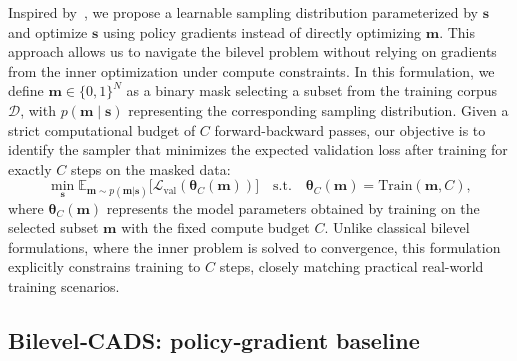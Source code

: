 Inspired by~\cite{ds_bi_zhou2022probabilistic}, we propose a learnable sampling distribution parameterized by \(\bm{s}\) and optimize \(\bm{s}\) using policy gradients instead of directly optimizing \(\bm{m}\). This approach allows us to navigate the bilevel problem without relying on gradients from the inner optimization under compute constraints.
In this formulation, we define \(\bm{m} \in \{0,1\}^N\) as a binary mask selecting a subset from the training corpus \(\mathcal{D}\), with \(p(\bm{m} \mid \bm{s})\) representing the corresponding sampling distribution. Given a strict computational budget of \(C\) forward-backward passes, our objective is to identify the sampler that minimizes the expected validation loss after training for exactly \(C\) steps on the masked data:
\begin{equation}  
\label{eq:bilevel}
\min_{\bm{s}} \mathbb{E}_{\bm{m} \sim p(\bm{m}|\bm{s})} \big[\mathcal{L}_{\mathrm{val}}(\bm{\theta}_C(\bm{m}))\big] \quad \text{s.t.} \quad \bm{\theta}_C(\bm{m}) = \mathrm{Train}(\bm{m}, C),
\end{equation}
where $\bm{\theta}_C(\bm{m})$ represents the model parameters obtained by training on the selected subset $\bm{m}$ with the fixed compute budget $C$. Unlike classical bilevel formulations, where the inner problem is solved to convergence, this formulation explicitly constrains training to $C$ steps, closely matching practical real-world training scenarios.  

\subsection{Bilevel‑CADS: policy‑gradient baseline}  
\label{sec:bilevel_cads}  

